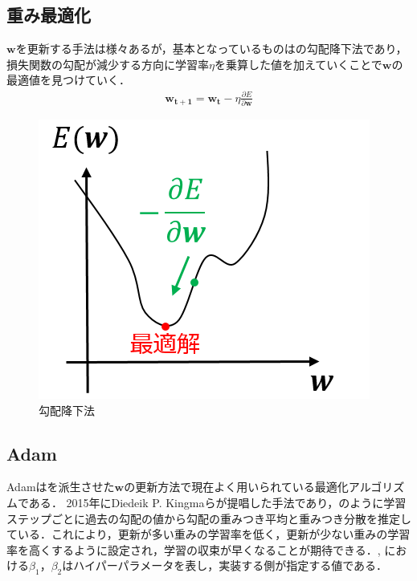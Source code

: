\subsection{重み最適化}
$\bm{w}$を更新する手法は様々あるが，基本となっているものはの勾配降下法であり，損失関数の勾配が減少する方向に学習率$\eta$を乗算した値を加えていくことで$\bm{w}$の最適値を見つけていく．
\begin{eqnarray}
	\label{eq:w_new}
	\bm{w_{t+1}} = \bm{w_{t}} - \eta \frac{\partial E}{\partial \bm{w}}
\end{eqnarray}
\begin{figure}[htbp]
	\begin{center}
		\includegraphics[scale=1]{./images/deeplearning/sgd.png}
		\caption{勾配降下法}
		\label{fig:sgd}
	\end{center}
\end{figure}

\newpage
\subsection{Adam}
Adamはを派生させた$\bm w$の更新方法で現在よく用いられている最適化アルゴリズムである\cite{Adam}．
2015年にDiedeik P. Kingmaらが提唱した手法であり，のように学習ステップごとに過去の勾配の値から勾配の重みつき平均と重みつき分散を推定している．これにより，更新が多い重みの学習率を低く，更新が少ない重みの学習率を高くするように設定され，学習の収束が早くなることが期待できる．, における$\beta_1，\beta_2$はハイパーパラメータを表し，実装する側が指定する値である．

